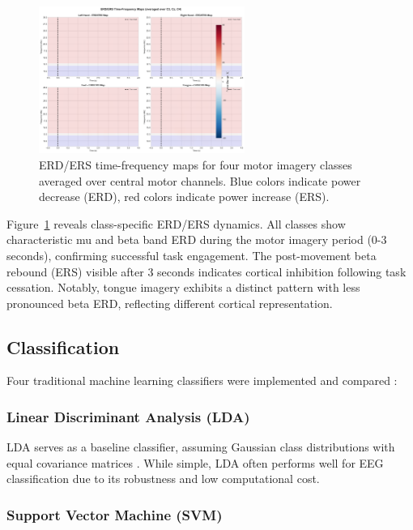 \documentclass[11pt]{article}
\begin{document}
\begin{figure}[H]
    \centering
    \includegraphics[width=0.6\textwidth]{../results/figures/03_erds_maps.png}
    \caption{ERD/ERS time-frequency maps for four motor imagery classes averaged over central motor channels. Blue colors indicate power decrease (ERD), red colors indicate power increase (ERS).}
    \label{fig:erds_maps}
\end{figure}

Figure~\ref{fig:erds_maps} reveals class-specific ERD/ERS dynamics. All classes show characteristic mu and beta band ERD during the motor imagery period (0-3 seconds), confirming successful task engagement. The post-movement beta rebound (ERS) visible after 3 seconds indicates cortical inhibition following task cessation. Notably, tongue imagery exhibits a distinct pattern with less pronounced beta ERD, reflecting different cortical representation.

\subsection{Classification}

Four traditional machine learning classifiers were implemented and compared \citep{pedregosa2011scikit,lotte2018review}:

\subsubsection{Linear Discriminant Analysis (LDA)}

LDA serves as a baseline classifier, assuming Gaussian class distributions with equal covariance matrices \citep{lotte2018review}. While simple, LDA often performs well for EEG classification due to its robustness and low computational cost.

\subsubsection{Support Vector Machine (SVM)}
\end{document}
